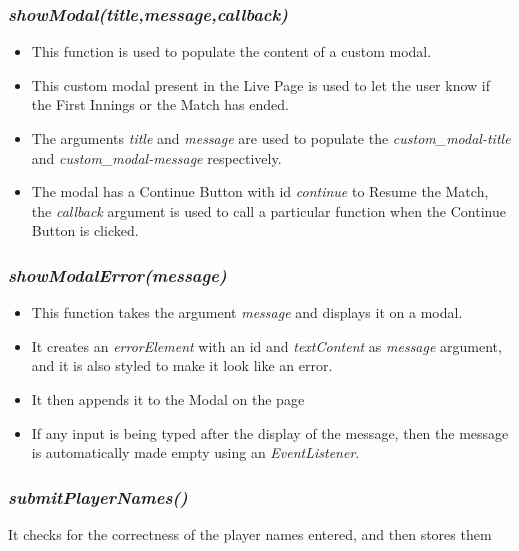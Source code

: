 \documentclass[a4paper,12pt]{article}
\begin{document}
\subsubsection{\textit{showModal(title,message,callback)}}
\begin{itemize}
\item This function is used to populate the content of a custom modal.
\item This custom modal present in the Live Page is used to let the user know if the First Innings or the Match has ended.
\item The arguments \textit{title} and \textit{message} are used to populate the \textit{custom\_modal-title} and \textit{custom\_modal-message} respectively.
\item The modal has a Continue Button with id \textit{continue} to Resume the Match, the \textit{callback} argument is used to call a particular function when the Continue Button is clicked.  
\end{itemize}

\subsubsection{\textit{showModalError(message)}}
\label{error2}
\begin{itemize}
\item This function takes the argument \textit{message} and displays it on a modal.
\item It creates an \textit{errorElement} with an id and \textit{textContent} as \textit{message} argument, and it is also styled to make it look like an error.
\item It then appends it to the Modal on the page
\item If any input is being typed after the display of the message, then the message is automatically made empty using an \textit{EventListener}.
\end{itemize}

\subsubsection{\textit{submitPlayerNames()}}
It checks for the correctness of the player names entered, and then stores them
\end{document}
